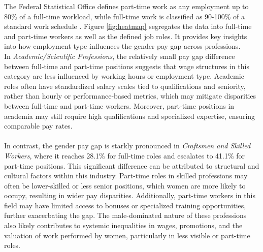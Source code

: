 \documentclass{article}
\begin{document}
The Federal Statistical Office defines part-time work as any employment up to 80\% of a full-time workload, while full-time work is classified as 90-100\% of a standard work schedule \cite{3}. Figure \ref{fig:heatmap} segregates the data into full-time and part-time workers as well as the defined job roles.  It provides key insights into how employment type influences the gender pay gap across professions. \\
In \textit{Academic/Scientific Professions}, the relatively small pay gap difference between full-time and part-time positions suggests that wage structures in this category are less influenced by working hours or employment type. Academic roles often have standardized salary scales tied to qualifications and seniority, rather than hourly or performance-based metrics, which may mitigate disparities between full-time and part-time workers. Moreover, part-time positions in academia may still require high qualifications and specialized expertise, ensuring comparable pay rates. \\
\\
In contrast, the gender pay gap is starkly pronounced in \textit{Craftsmen and Skilled Workers}, where it reaches 28.1\% for full-time roles and escalates to 41.1\% for part-time positions. This significant difference can be attributed to structural and cultural factors within this industry. Part-time roles in skilled professions may often be lower-skilled or less senior positions, which women are more likely to occupy, resulting in wider pay disparities. Additionally, part-time workers in this field may have limited access to bonuses or specialized training opportunities, further exacerbating the gap. The male-dominated nature of these professions also likely contributes to systemic inequalities in wages, promotions, and the valuation of work performed by women, particularly in less visible or part-time roles.\\
\end{document}
